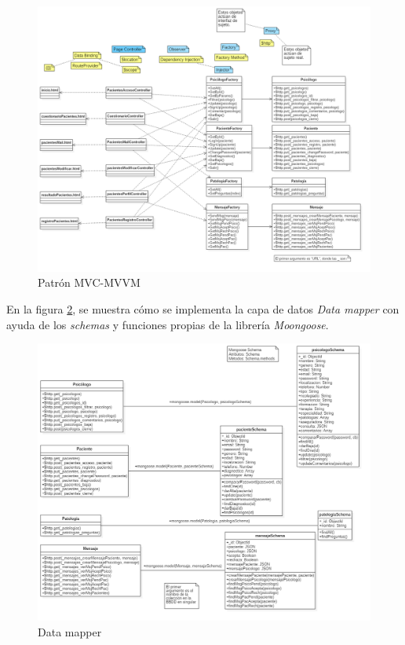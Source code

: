 \begin{figure}[htbp] 
    \centering
    \includegraphics[width=1\textwidth]{figuras/diagrama/MVC.png}
    \caption{Patrón MVC-MVVM}
    \label{fig:mvc_mvvm_sist}
\end{figure}	


En la figura \ref{fig:data_mapper}, se muestra cómo se implementa la capa de datos \textit{Data mapper} con ayuda de los \textit{schemas} y funciones propias de la librería \textit{Moongoose}.


\begin{figure}[htbp] 
    \centering
    \includegraphics[width=1\textwidth]{figuras/diagrama/Schema_data_mapper.png}
    \caption{Data mapper}
    \label{fig:data_mapper}
\end{figure}	


